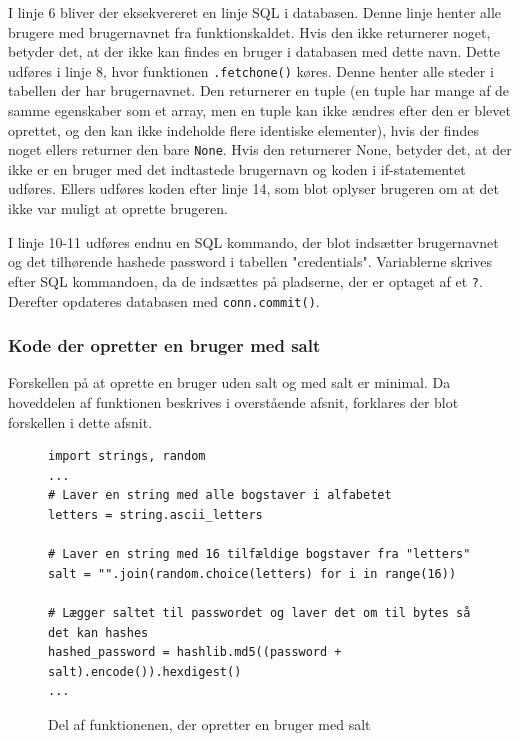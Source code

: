 \documentclass[12pt]{article}
\begin{document}
I linje 6 bliver der eksekvereret en linje SQL i databasen. Denne linje henter alle brugere med brugernavnet fra funktionskaldet. Hvis den ikke returnerer noget, betyder det, at der ikke kan findes en bruger i databasen med dette navn. Dette udføres i linje 8, hvor funktionen \verb|.fetchone()| køres. Denne henter alle steder i tabellen der har brugernavnet. Den returnerer en tuple (en tuple har mange af de samme egenskaber som et array, men en tuple kan ikke ændres efter den er blevet oprettet, og den kan ikke indeholde flere identiske elementer), hvis der findes noget ellers returner den bare \verb|None|\footnotemark[6]. Hvis den returnerer None, betyder det, at der ikke er en bruger med det indtastede brugernavn og koden i if-statementet udføres. Ellers udføres koden efter linje 14, som blot oplyser brugeren om at det ikke var muligt at oprette brugeren. 


I linje 10-11 udføres endnu en SQL kommando, der blot indsætter brugernavnet og det tilhørende hashede password i tabellen "credentials". Variablerne skrives efter SQL kommandoen, da de indsættes på pladserne, der er optaget af et \verb|?|.  Derefter opdateres databasen med \verb|conn.commit()|. 



\subsubsection{Kode der opretter en bruger med salt}
Forskellen på at oprette en bruger uden salt og med salt er minimal. Da hoveddelen af funktionen beskrives i overstående afsnit, forklares der blot forskellen i dette afsnit. 

\begin{figure}[ht]
\begin{verbatim}
import strings, random
...
# Laver en string med alle bogstaver i alfabetet
letters = string.ascii_letters  

# Laver en string med 16 tilfældige bogstaver fra "letters"
salt = "".join(random.choice(letters) for i in range(16))  

# Lægger saltet til passwordet og laver det om til bytes så det kan hashes
hashed_password = hashlib.md5((password + salt).encode()).hexdigest()
...
\end{verbatim}
\caption{Del af funktionenen, der opretter en bruger med salt}
\label{code:create-user-w-salt}
\end{figure}
\end{document}
